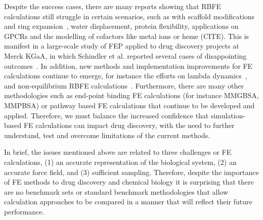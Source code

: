 \documentclass[9pt,bestpractices]{livecoms}
\begin{document}
Despite the success cases, there are many reports showing that RBFE calculations still struggle in certain scenarios,\cite{sherborne_collaborating_2016} such as with scaffold modifications~\cite{wangAccurateModelingScaffold2017} and ring expansion~\cite{liuRingBreakingFeasible2015}, water displacement\cite{michel_energetics_2009,brucemacdonald_ligand_2018,ross_enhancing_2020a,ben-shalom_accounting_2020}, protein flexibility\cite{huang_insights_2012,fratev_improved_2019,singh_absolute_2020}, applications on GPCRs\cite{lenselink_predicting_2016,deflorian_accurate_2020} and the modelling of cofactors like metal ions or heme (CITE). This is manifest in a large-scale study of FEP applied to drug discovery projects at Merck KGaA, in which Schindler et al. reported several cases of disappointing outcomes~\cite{schindler_largescale_2020}. In addition, new methods and implementation improvements for FE calculations continue to emerge, for instance the efforts on lambda dynamics~\cite{knightMultisiteDynamicsSimulated2011,vilseckPredictingBindingFree2018}, and non-equilibrium RBFE calculations~\cite{gapsysLargeScaleRelative2020,rufaChemicalAccuracyAlchemical2020}. Furthermore, there are many other methodologies such as end-point binding FE calculations (for instance MMGBSA, MMPBSA) or pathway based FE calculations that continue to be developed and applied. Therefore, we must balance the increased confidence that simulation-based FE calculations can impact drug discovery, with the need to further understand, test and overcome limitations of the current methods.

In brief, the issues mentioned above are related to three challenges or FE calculations,
(1) an accurate representation of the biological system, 
(2) an accurate force field, and 
(3) sufficient sampling. 
Therefore, despite the importance of FE methods to drug discovery and chemical biology it is surprising that there are no benchmark sets or standard benchmark methodologies that allow calculation approaches to be compared in a manner that will reflect their future performance. 
\end{document}
